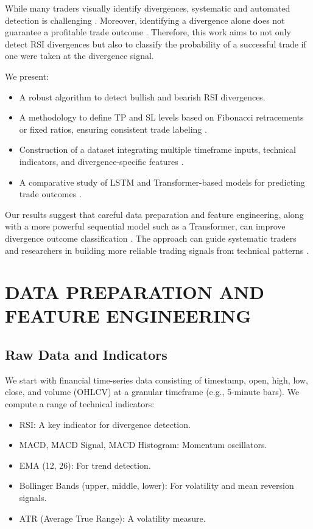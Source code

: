 \documentclass[letterpaper, 10 pt, conference]{ieeeconf}  %
\begin{document}
While many traders visually identify divergences, systematic and automated detection is challenging \cite{c6}. Moreover, identifying a divergence alone does not guarantee a profitable trade outcome \cite{c2}. Therefore, this work aims to not only detect RSI divergences but also to classify the probability of a successful trade if one were taken at the divergence signal.

We present:
\begin{itemize}
    \item A robust algorithm to detect bullish and bearish RSI divergences.
    \item A methodology to define TP and SL levels based on Fibonacci retracements or fixed ratios, ensuring consistent trade labeling \cite{c1}.
    \item Construction of a dataset integrating multiple timeframe inputs, technical indicators, and divergence-specific features \cite{c6}.
    \item A comparative study of LSTM and Transformer-based models for predicting trade outcomes \cite{c3,c4}.
\end{itemize}

Our results suggest that careful data preparation and feature engineering, along with a more powerful sequential model such as a Transformer, can improve divergence outcome classification \cite{c3,c4,c5}. The approach can guide systematic traders and researchers in building more reliable trading signals from technical patterns \cite{c2,c6}.

\section{DATA PREPARATION AND FEATURE ENGINEERING}

\subsection{Raw Data and Indicators}
We start with financial time-series data consisting of timestamp, open, high, low, close, and volume (OHLCV) at a granular timeframe (e.g., 5-minute bars). We compute a range of technical indicators:
\begin{itemize}
    \item RSI: A key indicator for divergence detection.
    \item MACD, MACD Signal, MACD Histogram: Momentum oscillators.
    \item EMA (12, 26): For trend detection.
    \item Bollinger Bands (upper, middle, lower): For volatility and mean reversion signals.
    \item ATR (Average True Range): A volatility measure.
\end{itemize}
\end{document}
